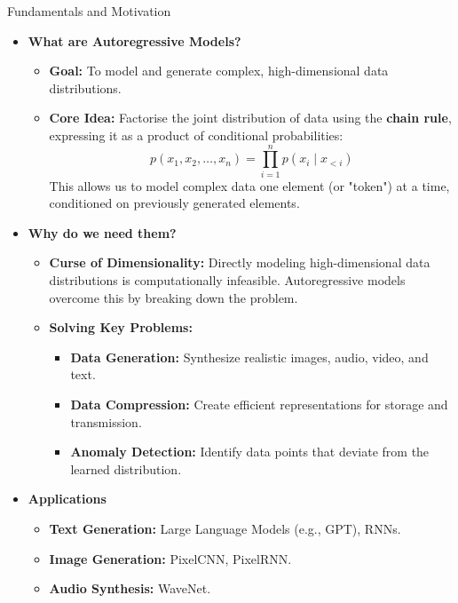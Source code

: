 \begin{frame}[allowframebreaks]{Fundamentals and Motivation}
    \begin{itemize}
        \item \textbf{What are Autoregressive Models?}
        \begin{itemize}
            \item \textbf{Goal:} To model and generate complex, high-dimensional data distributions.
            \item \textbf{Core Idea:} Factorise the joint distribution of data using the \textbf{chain rule}, expressing it as a product of conditional probabilities:
            \[
            p(x_1, x_2, \ldots, x_n) = \prod_{i=1}^n p(x_i \mid x_{<i})
            \]
            This allows us to model complex data one element (or "token") at a time, conditioned on previously generated elements.
        \end{itemize}
    \end{itemize}

    \framebreak
    
    \begin{itemize}
        \item \textbf{Why do we need them?}
        \begin{itemize}
            \item \textbf{Curse of Dimensionality:} Directly modeling high-dimensional data distributions is computationally infeasible. Autoregressive models overcome this by breaking down the problem.
            \item \textbf{Solving Key Problems:}
            \begin{itemize}
                \item \textbf{Data Generation:} Synthesize realistic images, audio, video, and text.
                \item \textbf{Data Compression:} Create efficient representations for storage and transmission.
                \item \textbf{Anomaly Detection:} Identify data points that deviate from the learned distribution.
            \end{itemize}
        \end{itemize}
    \end{itemize}

    \begin{itemize}
        \item \textbf{Applications}
        \begin{itemize}
            \item \textbf{Text Generation:} Large Language Models (e.g., GPT), RNNs.
            \item \textbf{Image Generation:} PixelCNN, PixelRNN.
            \item \textbf{Audio Synthesis:} WaveNet.
        \end{itemize}
    \end{itemize}
\end{frame}